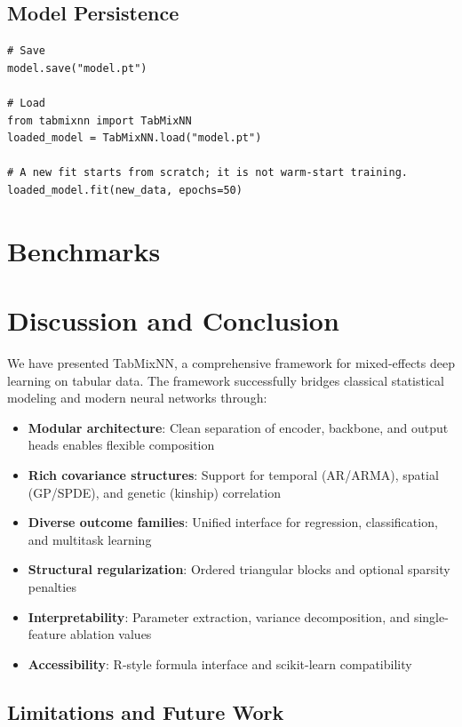 \documentclass[12pt,a4paper]{article}
\begin{document}
\subsection{Model Persistence}

\begin{lstlisting}
# Save
model.save("model.pt")

# Load
from tabmixnn import TabMixNN
loaded_model = TabMixNN.load("model.pt")

# A new fit starts from scratch; it is not warm-start training.
loaded_model.fit(new_data, epochs=50)
\end{lstlisting}

\section{Benchmarks}
\label{sec:benchmarks}



\section{Discussion and Conclusion}
\label{sec:discussion}

We have presented TabMixNN, a comprehensive framework for mixed-effects deep learning on tabular data. The framework successfully bridges classical statistical modeling and modern neural networks through:

\begin{itemize}
    \item \textbf{Modular architecture}: Clean separation of encoder, backbone, and output heads enables flexible composition
    \item \textbf{Rich covariance structures}: Support for temporal (AR/ARMA), spatial (GP/SPDE), and genetic (kinship) correlation
    \item \textbf{Diverse outcome families}: Unified interface for regression, classification, and multitask learning
    \item \textbf{Structural regularization}: Ordered triangular blocks and optional sparsity penalties
    \item \textbf{Interpretability}: Parameter extraction, variance decomposition, and single-feature ablation values
    \item \textbf{Accessibility}: R-style formula interface and scikit-learn compatibility
\end{itemize}

\subsection{Limitations and Future Work}
\end{document}
